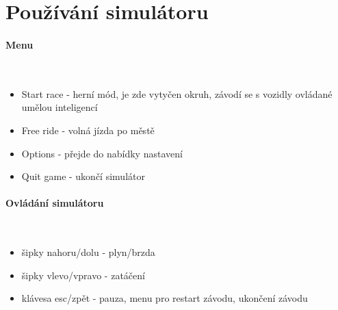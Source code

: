 \documentclass[11pt,twoside,a4paper]{book}
\begin{document}
\section{Používání simulátoru}
\paragraph{Menu}\ \ \\
\begin{itemize}
\item Start race - herní mód, je zde vytyčen okruh, závodí se s vozidly ovládané umělou inteligencí
\item Free ride - volná jízda po městě
\item Options - přejde do nabídky nastavení
\item Quit game - ukončí simulátor
\end{itemize}

\paragraph{Ovládání simulátoru}\ \ \\
\begin{itemize}
\item šipky nahoru/dolu - plyn/brzda
\item šipky vlevo/vpravo - zatáčení
\item klávesa esc/zpět - pauza, menu pro restart závodu, ukončení závodu
\end{itemize}
\end{document}
